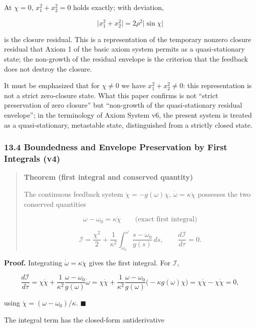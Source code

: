 \documentclass[
  a4paper,
]{article}
\begin{document}
At \(\chi=0\), \(x_1^2+x_2^2=0\) holds exactly; with deviation,

\[
\lvert x_1^2+x_2^2\rvert=2\rho^2\lvert\sin\chi\rvert
\]

is the closure residual. This is a representation of the temporary
nonzero closure residual that Axiom 1 of the basic axiom system permits
as a quasi-stationary state; the non-growth of the residual envelope is
the criterion that the feedback does not destroy the closure.

It must be emphasized that for \(\chi\ne0\) we have \(x_1^2+x_2^2\ne0\):
this representation is not a strict zero-closure state. What this paper
confirms is not ``strict preservation of zero closure'' but ``non-growth
of the quasi-stationary residual envelope''; in the terminology of Axiom
System v6, the present system is treated as a quasi-stationary,
metastable state, distinguished from a strictly closed state.

\subsubsection{13.4 Boundedness and Envelope Preservation by First
Integrals
(v4)}\label{boundedness-and-envelope-preservation-by-first-integrals-v4}

\begin{quote}
\textbf{Theorem (first integral and conserved quantity)}

The continuous feedback system \(\ddot\chi=-g(\omega)\chi\),
\(\dot\omega=\kappa\ddot\chi\) possesses the two conserved quantities

\[
\omega-\omega_0=\kappa\dot\chi
\qquad\text{(exact first integral)}
\]

\[
\mathcal I
=
\frac{\chi^2}{2}
+
\frac{1}{\kappa^2}
\int_{\omega_0}^{\omega}
\frac{s-\omega_0}{g(s)}\,ds,
\qquad
\frac{d\mathcal I}{d\tau}=0.
\]
\end{quote}

\textbf{Proof.} Integrating \(\dot\omega=\kappa\ddot\chi\) gives the
first integral. For \(\mathcal I\),

\[
\frac{d\mathcal I}{d\tau}
=\chi\dot\chi
+\frac{1}{\kappa^2}\frac{\omega-\omega_0}{g(\omega)}\dot\omega
=\chi\dot\chi
+\frac{1}{\kappa^2}\frac{\omega-\omega_0}{g(\omega)}\bigl(-\kappa g(\omega)\chi\bigr)
=\chi\dot\chi-\chi\dot\chi=0,
\]

using \(\dot\chi=(\omega-\omega_0)/\kappa\). \(\blacksquare\)

The integral term has the closed-form antiderivative
\end{document}
